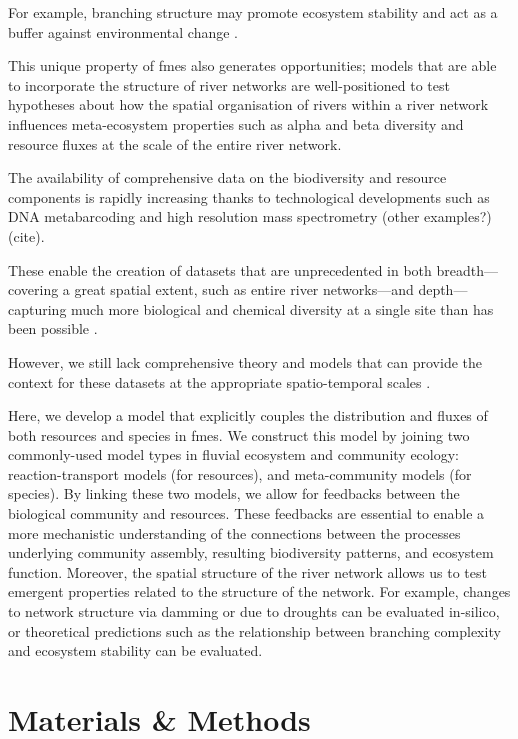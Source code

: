 \begin{itemize}
{		For example, branching structure may promote ecosystem stability and act as a buffer against environmental change \autocite{Terui2018}.
		
		This unique property of \acp{fme} also generates opportunities; models that are able to incorporate the structure of river networks are well-positioned to test hypotheses about how the spatial organisation of rivers within a river network influences meta-ecosystem properties such as alpha and beta diversity and resource fluxes at the scale of the entire river network.}

		{The availability of comprehensive data on the biodiversity and resource components is rapidly increasing thanks to technological developments such as DNA metabarcoding and high resolution mass spectrometry (other examples?) (cite).
		
		These enable the creation of datasets that are unprecedented in both breadth---covering a great spatial extent, such as entire river networks---and depth---capturing much more biological and chemical diversity at a single site than has been possible \autocite{Altermatt2020}.
		
		However, we still lack comprehensive theory and models that can provide the context for these datasets at the appropriate spatio-temporal scales \autocite{Gounand2018}.}
		{Here, we develop a model that explicitly couples the distribution and fluxes of both resources and species in \acp{fme}.
		We construct this model by joining two commonly-used model types in fluvial ecosystem and community ecology: reaction-transport models (for resources), and meta-community models (for species).
		By linking these two models, we allow for feedbacks between the biological community and resources.
		These feedbacks are essential to enable a more mechanistic understanding of the connections between the processes underlying community assembly, resulting biodiversity patterns, and ecosystem function.
		Moreover, the spatial structure of the river network allows us to test emergent properties related to the structure of the network.
		For example, changes to network structure via damming or due to droughts can be evaluated in-silico, or theoretical predictions such as the relationship between branching complexity and ecosystem stability \autocite{Terui2018} can be evaluated.}
\end{itemize}


\section{Materials \& Methods}

